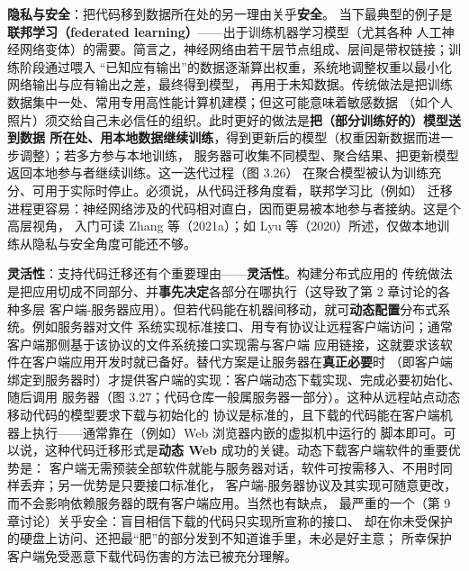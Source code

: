\medskip\noindent\textbf{隐私与安全}：把代码移到数据所在处的另一理由关乎\textbf{安全}。
当下最典型的例子是\textbf{联邦学习（federated learning）}——出于训练机器学习模型（尤其各种
人工神经网络变体）的需要。简言之，神经网络由若干层节点组成、层间是带权链接；训练阶段通过喂入
“已知应有输出”的数据逐渐算出权重，系统地调整权重以最小化网络输出与应有输出之差，最终得到模型，
再用于未知数据。传统做法是把训练数据集中一处、常用专用高性能计算机建模；但这可能意味着敏感数据
（如个人照片）须交给自己未必信任的组织。此时更好的做法是\textbf{把（部分训练好的）模型送到数据
所在处、用本地数据继续训练}，得到更新后的模型（权重因新数据而进一步调整）；若多方参与本地训练，
服务器可收集不同模型、聚合结果、把更新模型返回本地参与者继续训练。这一迭代过程（图 3.26）
在聚合模型被认为训练充分、可用于实际时停止。必须说，从代码迁移角度看，联邦学习比（例如）
迁移进程更容易：神经网络涉及的代码相对直白，因而更易被本地参与者接纳。这是个高层视角，
入门可读 Zhang 等（2021a）；如 Lyu 等（2020）所述，仅做本地训练从隐私与安全角度可能还不够。

\medskip\noindent\textbf{灵活性}：支持代码迁移还有个重要理由——\textbf{灵活性}。构建分布式应用的
传统做法是把应用切成不同部分、并\textbf{事先决定}各部分在哪执行（这导致了第 2 章讨论的各种多层
客户端-服务器应用）。但若代码能在机器间移动，就可\textbf{动态配置}分布式系统。例如服务器对文件
系统实现标准接口、用专有协议让远程客户端访问；通常客户端那侧基于该协议的文件系统接口实现需与客户端
应用链接，这就要求该软件在客户端应用开发时就已备好。替代方案是让服务器在\textbf{真正必要}时
（即客户端绑定到服务器时）才提供客户端的实现：客户端动态下载实现、完成必要初始化、随后调用
服务器（图 3.27；代码仓库一般属服务器一部分）。这种从远程站点动态移动代码的模型要求下载与初始化的
协议是标准的，且下载的代码能在客户端机器上执行——通常靠在（例如）Web 浏览器内嵌的虚拟机中运行的
脚本即可。可以说，这种代码迁移形式是\textbf{动态 Web} 成功的关键。动态下载客户端软件的重要优势是：
客户端无需预装全部软件就能与服务器对话，软件可按需移入、不用时同样丢弃；另一优势是只要接口标准化，
客户端-服务器协议及其实现可随意更改，而不会影响依赖服务器的既有客户端应用。当然也有缺点，
最严重的一个（第 9 章讨论）关乎安全：盲目相信下载的代码只实现所宣称的接口、
却在你未受保护的硬盘上访问、还把最“肥”的部分发到不知道谁手里，未必是好主意；
所幸保护客户端免受恶意下载代码伤害的方法已被充分理解。

\begin{closeread}
\end{closeread}

